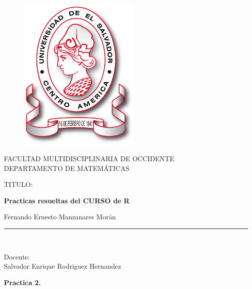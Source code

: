 \documentclass{article}
\begin{document}

\begin{titlepage}

\begin{center}
\vspace*{-1in}
\begin{figure}[htb]
\begin{center}
\includegraphics [width=6cm]{Minerva}
\end{center}
\end{figure}

FACULTAD MULTIDISCIPLINARIA DE OCCIDENTE\\
\vspace*{0.15in}
DEPARTAMENTO DE MATEMÁTICAS \\
\vspace*{0.6in}
\begin{large}
TITULO:\\
\end{large}
\vspace*{0.2in}
\begin{Large}
\textbf{Practicas resueltas del CURSO de R} \\
\end{Large}
\vspace*{0.3in}
\begin{large}
Fernando Ernesto Manzanares Morán\\
\end{large}
\vspace*{0.3in}
\rule{80mm}{0.1mm}\\
\vspace*{0.1in}
\begin{large}
Docente: \\
Salvador Enrique Rodriguez Hernandez \\
\end{large}
\end{center}

\end{titlepage}
\newpage
\textbf{Practica 2.}
\end{document}
